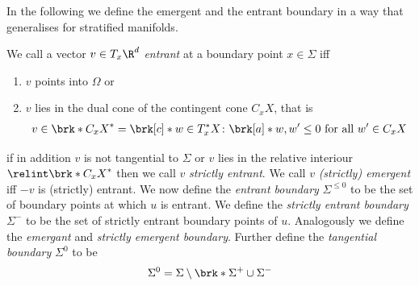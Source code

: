 In the following we define the emergent and the entrant boundary in a way that generalises
\cite[p.282]{Morse1970} for stratified manifolds.
\begin{definition}\label{df:emergentEntrantBd}
  We call a vector $v\in T_x\R^d$ \emph{entrant} at a boundary point $x\in\Sigma$ iff
  \begin{enumerate}
    \item $v$ points into $\Omega$ or
    \item $v$ lies in the dual cone of the contingent cone $C_xX$, that is
    \begin{align*}
      v\in \brk*{C_xX}^*=\brk[c]*{w\in T_x^*X\colon \brk[a]*{w, w'}\leq0\text{ for all }w'\in C_xX}
    \end{align*}
  \end{enumerate}
  if in addition $v$ is not tangential to $\Sigma$ or $v$ lies in the relative interiour $\relint\brk*{C_xX}^*$ then we
  call $v$ \emph{strictly entrant}. 
  We call $v$ \emph{(strictly) emergent} iff $-v$ is (strictly) entrant.
  We now define the \emph{entrant boundary} $\Sigma^{\leq0}$ to be the set of boundary points at which $u$ is entrant.
  We define the \emph{strictly entrant boundary} $\Sigma^-$ to be the set of strictly entrant boundary points of $u$.
  Analogously we define the \emph{emergant} and \emph{strictly emergent boundary}.
  Further define the \emph{tangential boundary} $\Sigma^0$ to be
  \begin{align}
    \Sigma^0=\Sigma\setminus\brk*{\Sigma^+\cup\Sigma^-}
  \end{align}
\end{definition}



